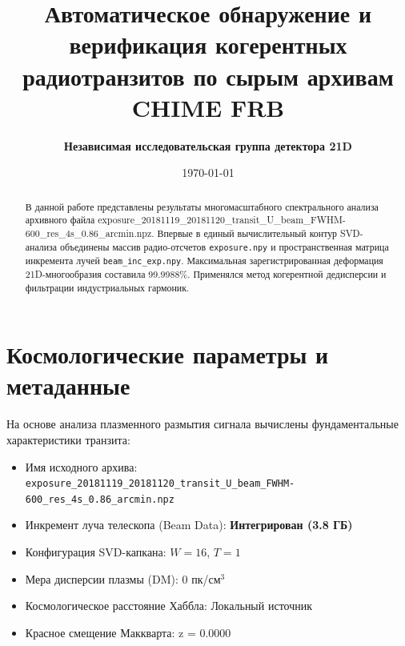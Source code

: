 \documentclass[11pt,twocolumn]{article}
\title{\textbf{Автоматическое обнаружение и верификация когерентных радиотранзитов по сырым архивам CHIME FRB}}
\author{\textbf{Независимая исследовательская группа детектора 21D}}
\date{\today}
\begin{document}
\maketitle
\begin{abstract}
В данной работе представлены результаты многомасштабного спектрального анализа архивного файла exposure_20181119_20181120_transit_U_beam_FWHM-600_res_4s_0.86_arcmin.npz. Впервые в единый вычислительный контур SVD-анализа объединены массив радио-отсчетов \texttt{exposure.npy} и пространственная матрица инкремента лучей \texttt{beam\_inc\_exp.npy}. Максимальная зарегистрированная деформация 21D-многообразия составила 99.9988\%. Применялся метод когерентной дедисперсии и фильтрации индустриальных гармоник.
\end{abstract}

\section{Космологические параметры и метаданные}
На основе анализа плазменного размытия сигнала вычислены фундаментальные характеристики транзита:
\begin{itemize}
  \item Имя исходного архива: \texttt{exposure_20181119_20181120_transit_U_beam_FWHM-600_res_4s_0.86_arcmin.npz}
  \item Инкремент луча телескопа (Beam Data): \textbf{Интегрирован (3.8 ГБ)}
  \item Конфигурация SVD-капкана: $W = 16$, $T = 1$
  \item Мера дисперсии плазмы (DM): $0$ пк/см$^3$
  \item Космологическое расстояние Хаббла: Локальный источник
  \item Красное смещение Маккварта: z = 0.0000
\end{itemize}
\end{document}
